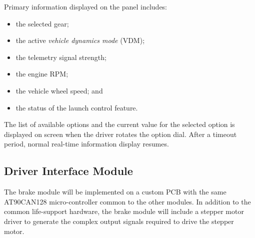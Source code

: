 Primary information displayed on the panel includes:

\begin{itemize}
\item the selected gear;
\item the active \emph{vehicle dynamics mode} (VDM);
\item the telemetry signal strength;
\item the engine RPM;
\item the vehicle wheel speed; and
\item the status of the launch control feature.
\end{itemize}

The list of available options and the current value for the selected option is displayed on screen when the driver rotates the option dial. After a timeout period, normal real-time information display resumes. 

\subsection{Driver Interface Module}

The brake module will be implemented on a custom PCB with the same AT90CAN128 micro-controller common to the other modules. In addition to the common life-support hardware, the brake module will include a stepper motor driver to generate the complex output signals required to drive the stepper motor.

